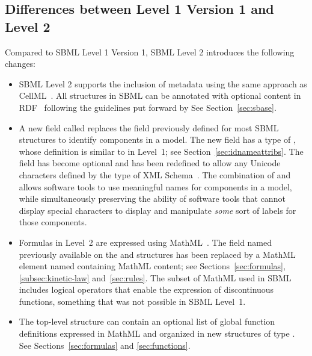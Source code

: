 \documentclass[10pt,twocolumntoc]{cekarticle}
\begin{document}
\subsection{Differences between Level 1 Version 1 and Level 2}

Compared to SBML Level 1 Version 1, SBML Level 2 introduces the following
changes: 
\begin{itemize}
  
\item SBML Level 2 supports the inclusion of metadata using the same approach as
  CellML~\citep{cuellar:2002}.  All structures in SBML can be annotated
  with optional content in RDF~\cite[Resource Description
  Format;][]{lassila:1999} following the guidelines put forward by
  \citeauthor{cuellar:2002}  See Section~\ref{sec:sbase}.
  
\item A new field called  replaces the  field
  previously defined for most SBML structures to identify components in a
  model.  The new  field has a type of , whose
  definition is similar to  in Level~1; see
  Section~\ref{sec:idnameattribs}.  The  field has become
  optional and has been redefined to allow any Unicode characters defined
  by the  type of XML Schema~\citep{biron:2000}.  The
  combination of  and  allows software tools to use
  meaningful names for components in a model, while simultaneously
  preserving the ability of software tools that cannot display special
  characters to display and manipulate \emph{some} sort of labels for those
  components.
  
\item Formulas in Level~2 are expressed using MathML~\citep{w3c:2000b}.
  The field named  previously available on the
   and  structures has been replaced by a
  MathML element named  containing MathML content; see
  Sections~\ref{sec:formulas}, \ref{subsec:kinetic-law}
  and~\ref{sec:rules}.  The subset of MathML used in SBML includes logical
  operators that enable the expression of discontinuous functions,
  something that was not possible in SBML Level~1.
  
\item The top-level  structure can contain an optional list of
  global function definitions expressed in MathML and organized in new
  structures of type .  See
  Sections~\ref{sec:formulas} and \ref{sec:functions}.
  

\end{itemize}
\end{document}
